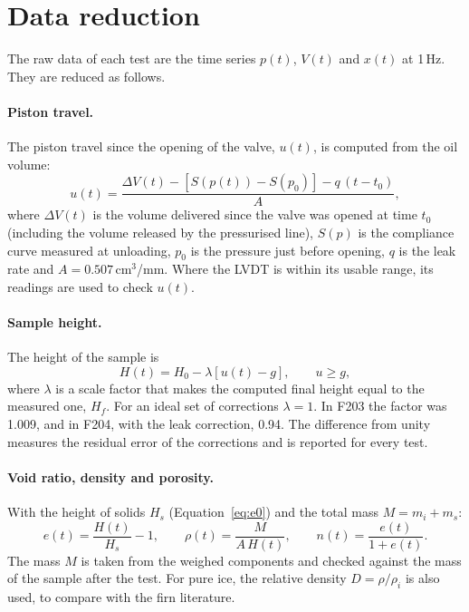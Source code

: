 \section{Data reduction}
\label{sec:data_reduction}

The raw data of each test are the time series $p(t)$, $V(t)$ and $x(t)$ at 1\,Hz. They are reduced as follows.

\paragraph{Piston travel.} The piston travel since the opening of the valve, $u(t)$, is computed from the oil volume:
\begin{equation}
    u(t) = \frac{\Delta V(t) - \left[S(p(t)) - S(p_0)\right] - q\,(t-t_0)}{A},
    \label{eq:travel}
\end{equation}
where $\Delta V(t)$ is the volume delivered since the valve was opened at time $t_0$ (including the volume released by the pressurised line), $S(p)$ is the compliance curve measured at unloading, $p_0$ is the pressure just before opening, $q$ is the leak rate and $A = 0.507$\,cm$^3$/mm. Where the LVDT is within its usable range, its readings are used to check $u(t)$.

\paragraph{Sample height.} The height of the sample is
\begin{equation}
    H(t) = H_0 - \lambda\left[u(t) - g\right], \qquad u\ge g,
    \label{eq:height}
\end{equation}
where $\lambda$ is a scale factor that makes the computed final height equal to the measured one, $H_f$. For an ideal set of corrections $\lambda = 1$. In F203 the factor was 1.009, and in F204, with the leak correction, 0.94. The difference from unity measures the residual error of the corrections and is reported for every test.

\paragraph{Void ratio, density and porosity.} With the height of solids $H_s$ (Equation~\eqref{eq:e0}) and the total mass $M = m_i + m_s$:
\begin{equation}
    e(t) = \frac{H(t)}{H_s} - 1, \qquad
    \rho(t) = \frac{M}{A\,H(t)}, \qquad
    n(t) = \frac{e(t)}{1+e(t)}.
    \label{eq:state}
\end{equation}
The mass $M$ is taken from the weighed components and checked against the mass of the sample after the test. For pure ice, the relative density $D = \rho/\rho_i$ is also used, to compare with the firn literature.

